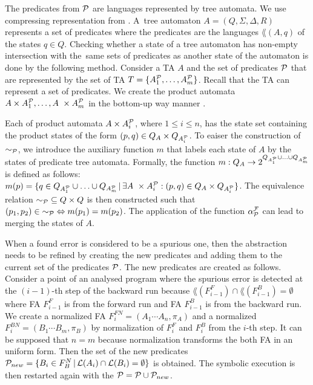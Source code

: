 The predicates from $\mathcal{P}$ are languages represented by tree automata.
We use compressing representation from \cite{artmc}.
A~tree automaton $A=(Q,\Sigma,\Delta, R)$ represents a set of predicates
where the predicates are the languages $\lang(A,q)$ of the states $q \in Q$.
Checking whether a state of a tree automaton has non-empty intersection
with the~same sets of predicates as another state of the automaton is done by the following method.
Consider a TA $A$ and the set of predicates $\mathcal{P}$
that are represented by the set of TA $T=\{A^\mathcal{P}_{1}, \ldots, A^\mathcal{P}_{m}\}$.
Recall that the TA can represent a set of predicates.
We create the product automata $A \times A^\mathcal{P}_{1}, \ldots, A~\times A^\mathcal{P}_{m}$
in the bottom-up way manner \cite{tata2007}.

Each of product automata $A \times A^\mathcal{P}_{i}$, where $1 \leq i \leq n$, has the state set
containing the product states of the form $(p,q) \in Q_A \times Q_{A^\mathcal{P}_{i}}$.
To eaiser the construction of $\sim_{\mathcal{P}}$, we introduce the auxiliary function $m$ that labels
each state of $A$ by the states of predicate tree automata.
Formally, the function $m: Q_A \rightarrow 2^{Q_{A^\mathcal{P}_{1}} \cup \ldots
\cup Q_{A^\mathcal{P}_{m}}}$ is defined as follows: $m(p) = \{q \in Q_{A^\mathcal{P}_{1}} \cup \ldots \cup Q_{A^\mathcal{P}_{m}}\,|\,
\exists A~\times A^\mathcal{P}_{i}: (p,q) \in Q_{A} \times Q_{A^\mathcal{P}_{i}}\}$.
The equivalence relation ${\sim_{\mathcal{P}}} \subseteq {Q \times Q}$ is then constructed
such that ${(p_1,p_2)} \in {\sim_{\mathcal{P}}} \Leftrightarrow m(p_1) = m(p_2)$.
The application of the function $\alpha_{\mathcal{P}}^{\mathcal{F}}$ can lead to merging the states of $A$.

When a found error is considered to be a spurious one, then the abstraction needs to be refined
by creating the new predicates and adding them to the current set of the predicates $\mathcal{P}$.
The new predicates are created as follows.
Consider a point of an analysed program where the spurious error
is detected at the $(i-1)$-th step of the backward run
because $\lang(F^F_{i-1}) \cap \lang(F^B_{i-1}) = \emptyset$ where FA $F^F_{i-1}$ is from the forward run
and FA $F^B_{i-1}$ is from the backward run.
We create a normalized FA $F_{i}^{\mathit{FN}} = (A_1 \cdots A_n, \pi_A)$ and a normalized $F_{i}^{\mathit{BN}} = (B_1 \cdots B_m, \pi_B)$
by normalization of $F^{\mathit{F}}_{i}$ and $F^\mathit{B}_{i}$ from the $i$-th step.
It can be supposed that $n = m$ because normalization transforms
the both FA in an uniform form.
Then the set of the new predicates $\mathcal{P}_{new} = \{B_i \in F^N_B \,|\, \mathcal{L}(A_i) \cap \mathcal{L}(B_i) =
\emptyset\}$ is obtained.
The symbolic execution is then restarted again with the $\mathcal{P} = \mathcal{P} \cup \mathcal{P}_{new}$.

